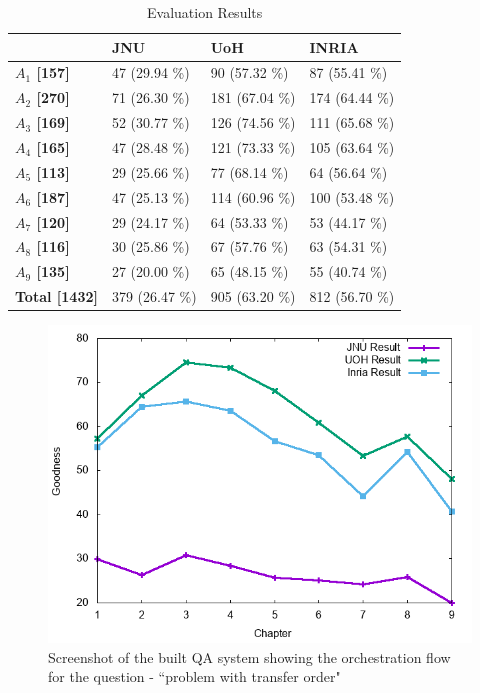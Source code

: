 \documentclass[11pt]{article}
\begin{document}
\begin{table}[h]
	\begin{center}
		\begin{tabular}{p{1.4cm} | p{1.6cm} | p{1.5cm} | p{1.5cm}}
			\hline 
			& \bf JNU & \bf UoH & \bf INRIA \\
			\hline
			
			
			\bf $A_1$ [157] &   47 (29.94 \%) &   90 (57.32 \%) &   87 (55.41 \%) \\
			\bf $A_2$ [270] &   71 (26.30 \%) &   181 (67.04 \%) &   174 (64.44 \%) \\
			\bf $A_3$ [169] &   52 (30.77 \%) &   126 (74.56 \%) &   111 (65.68 \%) \\
			\bf $A_4$ [165] &   47 (28.48 \%) &   121 (73.33 \%) &   105 (63.64 \%) \\
			\bf $A_5$ [113] &   29 (25.66 \%) &   77 (68.14 \%) &   64 (56.64 \%) \\
			\bf $A_6$ [187] &   47 (25.13 \%) &   114 (60.96 \%) &   100 (53.48 \%) \\
			\bf $A_7$ [120] &   29 (24.17 \%) &   64 (53.33 \%) &   53 (44.17 \%) \\
			\bf $A_8$ [116] &   30 (25.86 \%) &   67 (57.76 \%) &   63 (54.31 \%) \\
			\bf $A_9$ [135] &   27 (20.00 \%) &   65 (48.15 \%) &   55 (40.74 \%) \\
			\bf Total [1432] &   379 (26.47 \%) &   905 (63.20 \%) &   812 (56.70 \%) \\
			\hline
		\end{tabular}
	\end{center}
	\caption{\label{font-table} Evaluation Results }
\end{table}

\begin{figure}[h]
	\center
	\includegraphics[scale=0.34]{images/merge.png}
	\caption{\label{screen}Screenshot of the built QA system showing the orchestration flow for the question - ``problem with transfer order"}
\end{figure}
\end{document}
